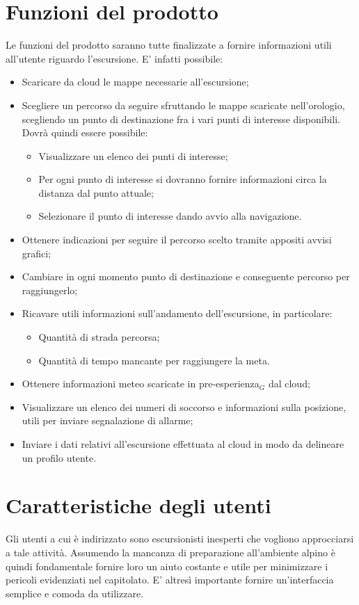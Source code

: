 \section{Funzioni del prodotto}
Le funzioni del prodotto saranno tutte finalizzate a fornire informazioni utili all'utente riguardo l'escursione. E' infatti possibile:
\begin{itemize}
\item Scaricare da cloud le mappe necessarie all'escursione;
\item Scegliere un percorso da seguire sfruttando le mappe scaricate nell'orologio, scegliendo un punto di destinazione fra i vari punti di interesse disponibili. \\Dovrà quindi essere possibile:
\begin{itemize}
\item Visualizzare un elenco dei punti di interesse;
\item Per ogni punto di interesse si dovranno fornire informazioni circa la distanza dal punto attuale;
\item Selezionare il punto di interesse dando avvio alla navigazione.
\end{itemize}
\item Ottenere indicazioni per seguire il percorso scelto tramite appositi avvisi grafici;
\item Cambiare in ogni momento punto di destinazione e conseguente percorso per raggiungerlo;
\item Ricavare utili informazioni sull'andamento dell'escursione, in particolare:
\begin{itemize}
\item Quantità di strada percorsa;
\item Quantità di tempo mancante per raggiungere la meta.
\end{itemize}
\item Ottenere informazioni meteo scaricate in pre-esperienza$_{G}$ dal cloud;
\item Visualizzare un elenco dei numeri di soccorso e informazioni sulla posizione, utili per inviare segnalazione di allarme;
\item Inviare i dati relativi all'escursione effettuata al cloud in modo da delineare un profilo utente.
\end{itemize}

\section{Caratteristiche degli utenti}
Gli utenti a cui è indirizzato \CAPITOLATO{} sono escursionisti inesperti che vogliono approcciarsi a tale attività. Assumendo la mancanza di preparazione all'ambiente alpino è quindi fondamentale fornire loro un aiuto costante e utile per minimizzare i pericoli evidenziati nel capitolato. E' altresì importante fornire un'interfaccia semplice e comoda da utilizzare.

